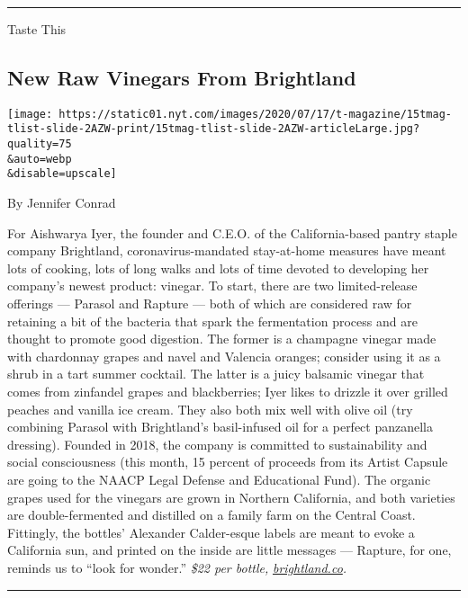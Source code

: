 \begin{center}\rule{0.5\linewidth}{\linethickness}\end{center}

Taste This

\hypertarget{new-raw-vinegars-from-brightland}{%
\subsection{New Raw Vinegars From
Brightland}\label{new-raw-vinegars-from-brightland}}

\texttt{[image: https://static01.nyt.com/images/2020/07/17/t-magazine/15tmag-tlist-slide-2AZW-print/15tmag-tlist-slide-2AZW-articleLarge.jpg?quality=75\\\&auto=webp\\\&disable=upscale]}

By Jennifer Conrad

For Aishwarya Iyer, the founder and C.E.O. of the California-based
pantry staple company Brightland, coronavirus-mandated stay-at-home
measures have meant lots of cooking, lots of long walks and lots of time
devoted to developing her company's newest product: vinegar. To start,
there are two limited-release offerings --- Parasol and Rapture --- both
of which are considered raw for retaining a bit of the bacteria that
spark the fermentation process and are thought to promote good
digestion. The former is a champagne vinegar made with chardonnay grapes
and navel and Valencia oranges; consider using it as a shrub in a tart
summer cocktail. The latter is a juicy balsamic vinegar that comes from
zinfandel grapes and blackberries; Iyer likes to drizzle it over grilled
peaches and vanilla ice cream. They also both mix well with olive oil
(try combining Parasol with Brightland's basil-infused oil for a perfect
panzanella dressing). Founded in 2018, the company is committed to
sustainability and social consciousness (this month, 15 percent of
proceeds from its Artist Capsule are going to the NAACP Legal Defense
and Educational Fund). The organic grapes used for the vinegars are
grown in Northern California, and both varieties are double-fermented
and distilled on a family farm on the Central Coast. Fittingly, the
bottles' Alexander Calder-esque labels are meant to evoke a California
sun, and printed on the inside are little messages --- Rapture, for one,
reminds us to ``look for wonder.'' \emph{\$22 per bottle,}
\href{http://brightland.co/}{\emph{brightland.co}}\emph{.}

\begin{center}\rule{0.5\linewidth}{\linethickness}\end{center}

